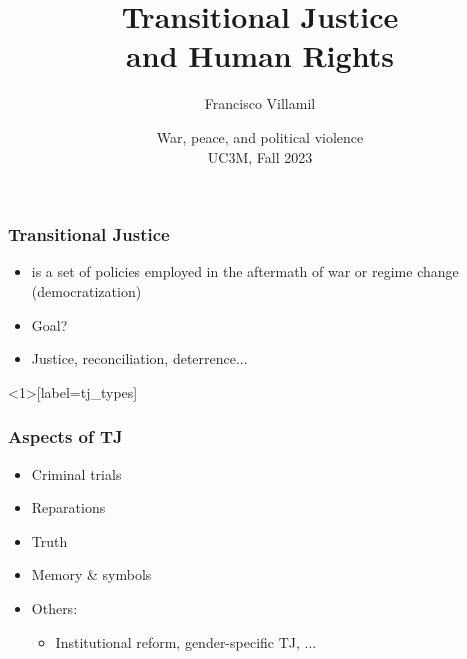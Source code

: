 \documentclass[aspectratio=43]{beamer}
\title{\huge Transitional Justice\\\vspace{5pt}and Human Rights}
\author{Francisco Villamil}
\date{War, peace, and political violence\\UC3M, Fall 2023}
\begin{document}
\begin{frame}
  \titlepage
\end{frame}


\begin{frame}
\frametitle{Transitional Justice}
\centering

\begin{itemize}
  \item {} is a set of policies employed in the aftermath of war or regime change (democratization)
  \item Goal?
  \item<2-> Justice, reconciliation, deterrence...
\end{itemize}

\end{frame}

\begin{frame}<1>[label=tj_types]
\frametitle{Aspects of TJ}
\centering

\begin{itemize}
  \item Criminal trials
  \item<2-> Reparations
  \item<3-> Truth
  \item<4-> Memory \& symbols
  \item<5-> Others:
  \begin{itemize}
    \item Institutional reform, gender-specific TJ, ...
  \end{itemize}
\end{itemize}

\end{frame}

\end{document}
